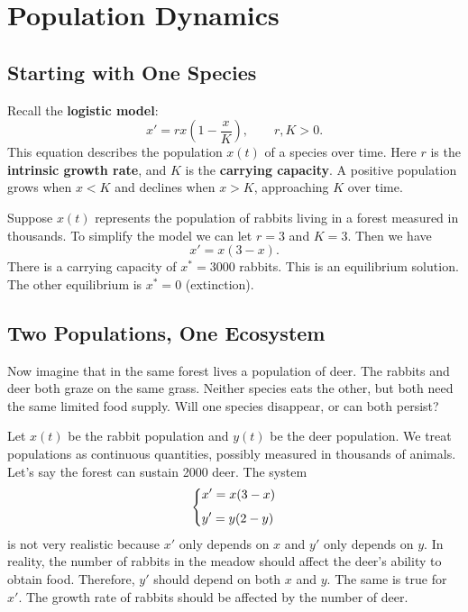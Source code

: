 \documentclass[10pt,letterpaper]{article}
\begin{document}


\section{Population Dynamics}

\subsection{Starting with One Species}
Recall the \textbf{logistic model}:
\[
x'=rx\left(1-\frac{x}{K}\right),\qquad r,K>0.
\]
This equation describes the population $x(t)$ of a species over time.
Here $r$ is the \textbf{intrinsic growth rate}, and $K$ is
the \textbf{carrying capacity}. A positive population grows when
$x<K$ and declines when $x>K$, approaching $K$ over time. 

Suppose $x(t)$ represents the population of rabbits living in a forest measured in thousands. To simplify the model we can let $r=3$ and $K=3$. Then we have 
$$
    x' = x(3-x). 
$$
There is a carrying capacity of $x^*=3000$ rabbits. This is an equilibrium solution. The other equilibrium is $x^*=0$ (extinction).

\subsection{Two Populations, One Ecosystem}
Now imagine that in the same forest lives a population of deer. The rabbits and deer both graze on the same grass. Neither species eats the other, but both need the same limited food supply. Will one species disappear, or can both persist?

Let $x(t)$ be the rabbit population and $y(t)$ be the deer population. We treat populations as continuous quantities, possibly measured in
thousands of animals. Let's say the forest can sustain 2000 deer. The system
\begin{equation}\label{1}    
\begin{dcases} 
    x' = x(3-x)\\[4pt]
    y' = y(2-y)
\end{dcases}
\end{equation}
is not very realistic because $x'$ only depends on $x$ and $y'$ only depends on $y$. In reality, the number of rabbits in the meadow should affect the deer's ability to obtain food. Therefore, $y'$ should depend on both $x$ and $y$. The same is true for $x'$. The growth rate of rabbits should be affected by the number of deer.
\end{document}
